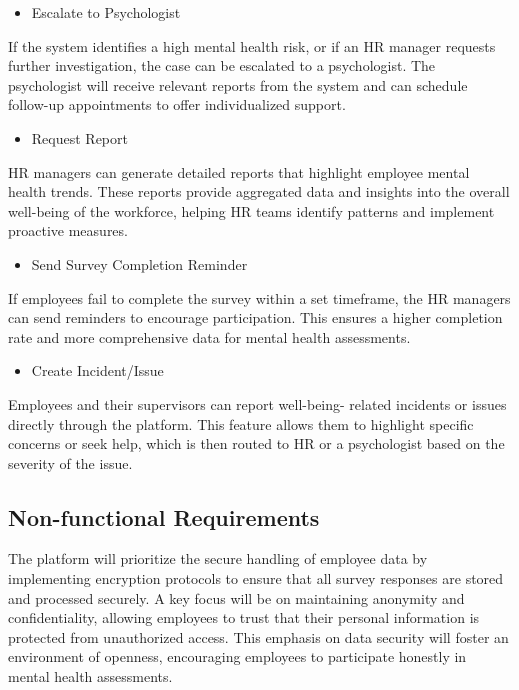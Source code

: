 \documentclass[conference]{IEEEtran}
\begin{document}
\begin{itemize}
        \item Escalate to Psychologist
        \end{itemize}
        
        If the system identifies a high mental health risk, or if an
        HR manager requests further investigation, the case can be
        escalated to a psychologist. The psychologist will receive
        relevant reports from the system and can schedule follow-up
        appointments to offer individualized support.
        \newline

 \begin{itemize}
     \item Request Report
     \end{itemize}
            
     HR managers can generate detailed reports that highlight
     employee mental health trends. These reports provide
     aggregated data and insights into the overall well-being of the
     workforce, helping HR teams identify patterns and implement
     proactive measures.
\newline

\begin{itemize}
    \item Send Survey Completion Reminder
    \end{itemize}
           
    If employees fail to complete the survey within a set
timeframe, the HR managers can send reminders to encourage
participation. This ensures a higher completion rate and more
comprehensive data for mental health assessments.
\newline

\begin{itemize}
    \item Create Incident/Issue
    \end{itemize}
           
    Employees and their supervisors can report well-being-
related incidents or issues directly through the platform. This
feature allows them to highlight specific concerns or seek
help, which is then routed to HR or a psychologist based on
the severity of the issue.



\subsection{Non-functional Requirements}\label{AA}
The platform will prioritize the secure handling of
employee data by implementing encryption protocols to
ensure that all survey responses are stored and processed
securely. A key focus will be on maintaining anonymity and
confidentiality, allowing employees to trust that their personal
information is protected from unauthorized access. This
emphasis on data security will foster an environment of
openness, encouraging employees to participate honestly in
mental health assessments.\newline
\end{document}
